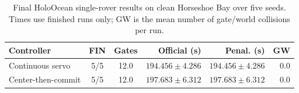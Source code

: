 \begin{table}[t]
\centering
\caption{Final HoloOcean single-rover results on clean Horseshoe Bay over five seeds. Times use finished runs only; GW is the mean number of gate/world collisions per run.}
\label{tab:controller_comparison}
\scriptsize
\setlength{\tabcolsep}{2pt}
\renewcommand{\arraystretch}{1.12}
\begin{tabular}{lccrrr}
\toprule
Controller & FIN & Gates & Official (s) & Penal. (s) & GW \\
\midrule
Continuous servo   & 5/5 & 12.0 & $194.456\pm4.286$ & $194.456\pm4.286$ & 0.0 \\
Center-then-commit & 5/5 & 12.0 & $197.683\pm6.312$ & $197.683\pm6.312$ & 0.0 \\
\bottomrule
\end{tabular}
\end{table}
